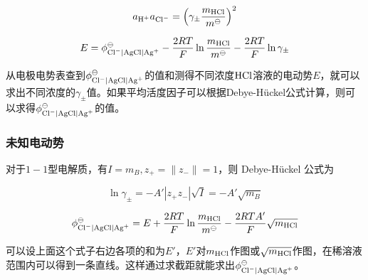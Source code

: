 \begin{equation*}
    a_{\ce{H+}} a_{\ce{Cl-}}= \left(\gamma_\pm  \frac{m_{\ce{HCl} }}{m^\ominus} \right)^2
\end{equation*}

\begin{equation*}
    E = \phi^\ominus_{\ce{Cl-} | \ce{AgCl} | \ce{Ag+}} - \frac{2RT}{F} \ln \frac{m_{\ce{HCl}}}{m^\ominus} - \frac{2RT}{F} \ln \gamma_\pm
\end{equation*}

从电极电势表查到$\phi^\ominus_{\ce{Cl-} | \ce{AgCl} | \ce{Ag+}}$的值和测得不同浓度$\ce{HCl}$溶液的电动势$E$，就可以求出不同浓度的$\gamma_\pm$值。如果平均活度因子可以根据Debye-Hückel公式计算，则可以求得$\phi^\ominus_{\ce{Cl-} | \ce{AgCl} | \ce{Ag+}}$的值。

\subsubsection{未知电动势}

对于$1 - 1$型电解质，有$I = m_B, z_+ = \| z_- \| = 1$，则 Debye-Hückel 公式为

\begin{equation*}
    \ln \gamma_\pm = - A' \left\lvert z_+ z_- \right\rvert \sqrt{I} = -A' \sqrt{m_B}
\end{equation*}


\begin{equation*}
    \phi^\ominus_{\ce{Cl-} | \ce{AgCl} | \ce{Ag+}} = E + \frac{2RT}{F} \ln \frac{m_{\ce{HCl}}}{m^\ominus} - \frac{2RTA'}{F} \sqrt{m_{\ce{HCl}}}
\end{equation*}

可以设上面这个式子右边各项的和为$E'$，$E'$对$m_{\ce{HCl}}$作图或$\sqrt{m_{\ce{HCl}}}$作图，在稀溶液范围内可以得到一条直线。这样通过求截距就能求出$\phi^\ominus_{\ce{Cl-} | \ce{AgCl} | \ce{Ag+}}$。

